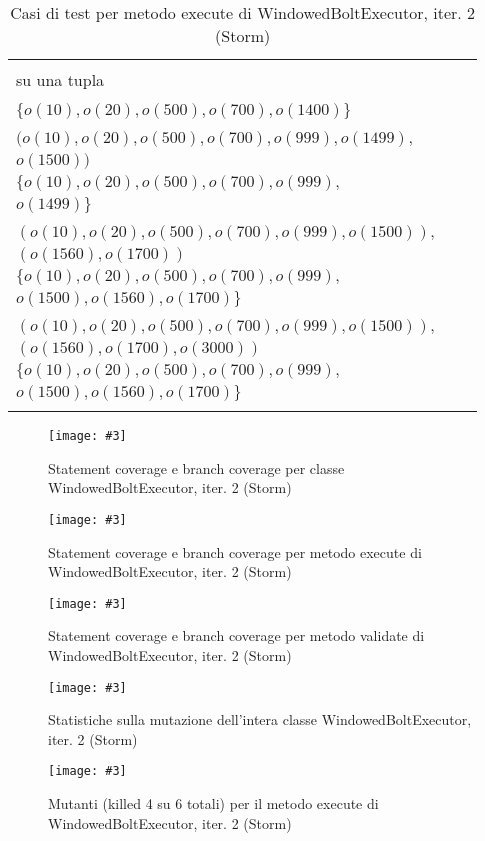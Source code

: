 \documentclass[10pt, a4paper]{article}
\newcommand{\Intmaketable}[4]{
	\begin{longtable}{#3}
	#4
	\caption{#2}
	\label{#1}
	\end{longtable}
}
\newcommand{\Inttestctable}[3]{
	\Intmaketable{#1}{#2}{|l|l|l|}{
	\hline
	\thead{Input} & \thead{Esito atteso} & \thead{Motivazione}\\
	\hline
	\hline
	#3
	\hline}
}
\newcommand{\Inttestccaption}[4]{Casi di test per metodo #1 di #2, iter. #3 (#4)}
\newcommand{\gettablelabel}[5]{table:#1:#2:#3:iter#4:proj#5}
\newcommand{\testctable}[5]{
	\Inttestctable{\gettablelabel{testc}{#1}{#2}{#3}{#4}}
		{\Inttestccaption{#1}{#2}{#3}{#4}}
		{#5}
}
\newcommand{\getpicturelabel}[1]{picture:#1}
\newcommand{\makepicture}[4]{
	\begin{figure}[H]
	\centering
	\texttt{[image: \#3]}
	\caption{#4}
	\label{\getpicturelabel{#3}}
	\end{figure}
}
\newcommand{\methodcfcovcaption}[4]{Statement coverage e branch coverage per metodo #1 di #2, iter. #3 (#4)}
\newcommand{\classcfcovcaption}[3]{Statement coverage e branch coverage per classe #1, iter. #2 (#3)}
\newcommand{\mutclasscaption}[3]{Statistiche sulla mutazione dell'intera classe #1, iter. #2 (#3)}
\newcommand{\mutmethodcaption}[6]{Mutanti (killed #5 su #6 totali) per il metodo #1 di #2, iter. #3 (#4)}
\newcommand{\tcell}{\makecell[tl]}
\newcommand{\newtrow}{\\ \hline}
\def\storm{Storm}
\begin{document}
	\testctable{execute}{WindowedBoltExecutor}{2}{\storm}{
			\tcell{makeTuple(1499)} &
			\tcell{Nessuna tupla di finestre} &
			\tcell{Nessuna pre-esecuzione del bolt\\su una tupla} 
		\newtrow
			\tcell{makeTuple(1499)} &
			\tcell{Nessuna tupla di finestre} &
			\tcell{Pre-esecuzione del bolt su tuple\\$\{o(10),o(20),o(500),o(700),o(1400)\}$} 
		\newtrow
			\tcell{makeTuple(1500)} &
			\tcell{Una finestra di tuple:\\$(o(10),o(20),o(500),o(700),o(999),o(1499),$\\$o(1500))$} &
			\tcell{Pre-esecuzione del bolt su tuple\\$\{o(10),o(20),o(500),o(700),o(999),$\\$o(1499)\}$} 
		\newtrow
			\tcell{makeTuple(3100)} &
			\tcell{Due finestre di tuple:\\$(o(10),o(20),o(500),o(700),o(999),o(1500)),$\\$(o(1560),o(1700))$} &
			\tcell{Pre-esecuzione del bolt su tuple\\$\{o(10),o(20),o(500),o(700),o(999),$\\$o(1500),o(1560),o(1700)\}$}
		\newtrow
			\tcell{makeTuple(3000)} &
			\tcell{Due finestre di tuple:\\$(o(10),o(20),o(500),o(700),o(999),o(1500)),	$\\$(o(1560),o(1700),o(3000))$} &
			\tcell{Pre-esecuzione del bolt su tuple\\$\{o(10),o(20),o(500),o(700),o(999),$\\$o(1500),o(1560),o(1700)\}$} 
		\newtrow
	}
		
	\makepicture{18cm}{0.75cm}{storm/controlflow-WindowedBoltExecutor-2}
				{\classcfcovcaption{WindowedBoltExecutor}{2}{\storm}}
	
	\makepicture{18cm}{0.5cm}{storm/controlflow-execute-WindowedBoltExecutor-2}
				{\methodcfcovcaption{execute}{WindowedBoltExecutor}{2}{\storm}}
				
	\makepicture{17cm}{8cm}{storm/controlflow-validate-WindowedBoltExecutor-2}
				{\methodcfcovcaption{validate}{WindowedBoltExecutor}{2}{\storm}}
				
	\makepicture{17cm}{1.5cm}{storm/mutation-WindowedBoltExecutor-2}
				{\mutclasscaption{WindowedBoltExecutor}{2}{\storm}}
				
	\makepicture{17cm}{8cm}{storm/mutation-execute-WindowedBoltExecutor-2}
				{\mutmethodcaption{execute}{WindowedBoltExecutor}{2}{\storm}{4}{6}}
				
\end{document}
